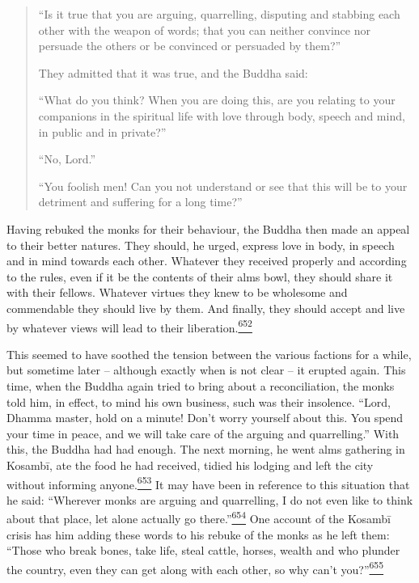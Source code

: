 \begin{quote}
``Is it true that you are arguing, quarrelling, disputing and stabbing
each other with the weapon of words; that you can neither convince nor
persuade the others or be convinced or persuaded by them?''

They admitted that it was true, and the Buddha said:

``What do you think? When you are doing this, are you relating to your
companions in the spiritual life with love through body, speech and
mind, in public and in private?''

``No, Lord.''

``You foolish men! Can you not understand or see that this will be to
your detriment and suffering for a long time?''
\end{quote}

Having rebuked the monks for their behaviour, the Buddha then made an
appeal to their better natures. They should, he urged, express love in
body, in speech and in mind towards each other. Whatever they received
properly and according to the rules, even if it be the contents of their
alms bowl, they should share it with their fellows. Whatever virtues
they knew to be wholesome and commendable they should live by them. And
finally, they should accept and live by whatever views will lead to
their
liberation.\label{footprints_split_016.html_fnref652}\hyperref[footprints_split_025.htmlux5cux23fn652]{\textsuperscript{652}}

This seemed to have soothed the tension between the various factions for
a while, but sometime later -- although exactly when is not clear -- it
erupted again. This time, when the Buddha again tried to bring about a
reconciliation, the monks told him, in effect, to mind his own business,
such was their insolence. ``Lord, Dhamma master, hold on a minute! Don't
worry yourself about this. You spend your time in peace, and we will
take care of the arguing and quarrelling.'' With this, the Buddha had
had enough. The next morning, he went alms gathering in Kosambī, ate the
food he had received, tidied his lodging and left the city without
informing
anyone.\label{footprints_split_016.html_fnref653}\hyperref[footprints_split_025.htmlux5cux23fn653]{\textsuperscript{653}}
It may have been in reference to this situation that he said: ``Wherever
monks are arguing and quarrelling, I do not even like to think about
that place, let alone actually go
there.''\label{footprints_split_016.html_fnref654}\hyperref[footprints_split_025.htmlux5cux23fn654]{\textsuperscript{654}}
One account of the Kosambī crisis has him adding these words to his
rebuke of the monks as he left them: ``Those who break bones, take life,
steal cattle, horses, wealth and who plunder the country, even they can
get along with each other, so why can't
you?''\label{footprints_split_016.html_fnref655}\hyperref[footprints_split_025.htmlux5cux23fn655]{\textsuperscript{655}}

